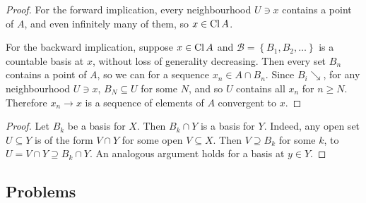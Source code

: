 
\begin{proof}
    For the forward implication, every neighbourhood \( U \ni x \) contains a point of \( A \), and even infinitely many of them, so \( x \in \operatorname{Cl} A \).

    For the backward implication, suppose \( x \in \operatorname{Cl} A \) and \( \mathcal{B} = \left\{ B_1, B_2, \ldots \right\} \) is a countable basis at \( x \), without loss of generality decreasing. Then every set \( B_n \) contains a point of \( A \), so we can for a sequence \( x_n \in A \cap B_n \). Since \( B_i \searrow \), for any neighbourhood \( U \ni x \), \( B_N \subseteq U \) for some \( N \), and so \( U \) contains all \( x_n \) for \( n \geqslant N \). Therefore \( x_n \to x \) is a sequence of elements of \( A \) convergent to \( x \).
\end{proof}


\begin{proof}
    Let \( B_k \) be a basis for \( X \). Then \( B_k \cap Y \) is a basis for \( Y \). Indeed, any open set \( U \subseteq Y \) is of the form \( V \cap Y \) for some open \( V \subseteq X \). Then \( V \supseteq B_k \) for some \( k \), to \( U = V \cap Y \supseteq B_k \cap Y \). An analogous argument holds for a basis at \( y \in Y \).
\end{proof}

\subsection{Problems}


